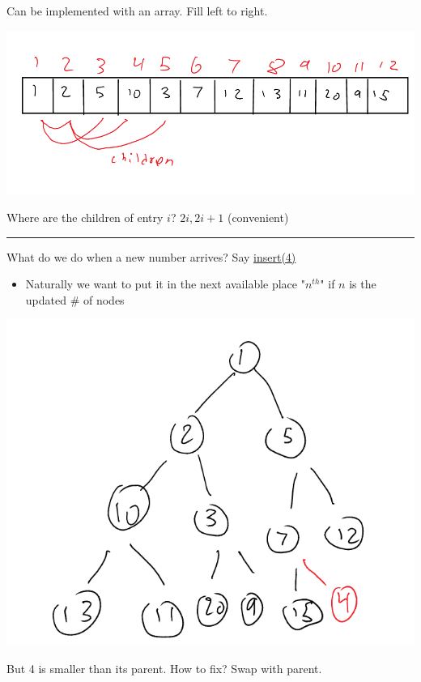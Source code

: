 \documentclass[11pt]{article}
\begin{document}
Can be implemented with an array. Fill left to right.

\begin{center}
\includegraphics[width=.9\linewidth]{./Images/i12.png}
\end{center}

Where are the children of entry \(i\)? \(2i, 2i+1\) (convenient)

\noindent\rule{\textwidth}{0.5pt}
What do we do when a new number arrives? Say \uline{insert(4)}
\begin{itemize}
\item Naturally we want to put it in the next available place "\(n^{th}\)" if \(n\) is the updated \# of nodes
\end{itemize}

\begin{center}
\includegraphics[width=.9\linewidth]{./Images/i13.png}
\end{center}

But 4 is smaller than its parent. How to fix? Swap with parent.
\end{document}
